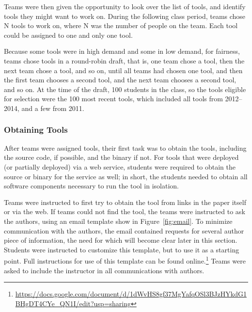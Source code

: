 \documentclass{sig-alternate-05-2015}
\begin{document}
Teams were then given the opportunity to look over the list of
tools, and identify tools they might want to work on.
During the following class period, teams chose N tools to work on,
where N was the number of people on the team.
Each tool could be assigned to one and only one tool.

Because some tools were in high demand and some in low demand, for fairness,
teams chose tools in a round-robin draft,
that is, one team chose a tool, then the next team chose a tool, and so on,
until all teams had chosen one tool, and then the first team chooses a second
tool, and the next team chooses a second tool, and so on.
At the time of the draft, 100 students in the class, so the tools eligible
for selection were the 100 most recent tools, which included all tools
from 2012--2014, and a few from 2011.

\subsubsection{Obtaining Tools}

After teams were assigned tools, their first task was to 
obtain the tools, including the source code, if possible,
and the binary if not.
For tools that were deployed (or partially deployed) via a web service, 
students were required to obtain the source or binary for
the service as well; in short, the students needed to
obtain all software components necessary to run the tool
in isolation. 

Teams were instructed to first try to 
obtain the tool from links in the paper itself or via
the web.
If teams could not find the tool, the teams
were instructed to ask the authors, using an email
template show in Figure~\ref{fig:email}.
To minimize communication with the authors, 
the email contained requests for several author
piece of information, the need for which will become 
clear later in this section.
Students were instructed to customize this template,
but to use it as a starting point. 
Full instructions for use of this template can be found 
online.\footnote{\url{https://docs.google.com/document/d/1dWvHS8gf37MgYafqOSl3BJzHYkdG1BHgDT4CYe_QN1I/edit?usp=sharing}}
Teams were asked to include the instructor in
all communications with authors.
\end{document}
